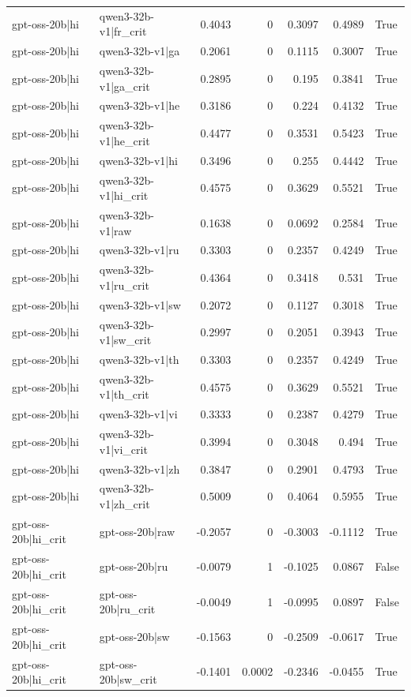 \begin{table}
\begin{tabular}{l l r r r r l}
gpt-oss-20b|hi & qwen3-32b-v1|fr_crit & 0.4043 & 0 & 0.3097 & 0.4989 & True \\
gpt-oss-20b|hi & qwen3-32b-v1|ga & 0.2061 & 0 & 0.1115 & 0.3007 & True \\
gpt-oss-20b|hi & qwen3-32b-v1|ga_crit & 0.2895 & 0 & 0.195 & 0.3841 & True \\
gpt-oss-20b|hi & qwen3-32b-v1|he & 0.3186 & 0 & 0.224 & 0.4132 & True \\
gpt-oss-20b|hi & qwen3-32b-v1|he_crit & 0.4477 & 0 & 0.3531 & 0.5423 & True \\
gpt-oss-20b|hi & qwen3-32b-v1|hi & 0.3496 & 0 & 0.255 & 0.4442 & True \\
gpt-oss-20b|hi & qwen3-32b-v1|hi_crit & 0.4575 & 0 & 0.3629 & 0.5521 & True \\
gpt-oss-20b|hi & qwen3-32b-v1|raw & 0.1638 & 0 & 0.0692 & 0.2584 & True \\
gpt-oss-20b|hi & qwen3-32b-v1|ru & 0.3303 & 0 & 0.2357 & 0.4249 & True \\
gpt-oss-20b|hi & qwen3-32b-v1|ru_crit & 0.4364 & 0 & 0.3418 & 0.531 & True \\
gpt-oss-20b|hi & qwen3-32b-v1|sw & 0.2072 & 0 & 0.1127 & 0.3018 & True \\
gpt-oss-20b|hi & qwen3-32b-v1|sw_crit & 0.2997 & 0 & 0.2051 & 0.3943 & True \\
gpt-oss-20b|hi & qwen3-32b-v1|th & 0.3303 & 0 & 0.2357 & 0.4249 & True \\
gpt-oss-20b|hi & qwen3-32b-v1|th_crit & 0.4575 & 0 & 0.3629 & 0.5521 & True \\
gpt-oss-20b|hi & qwen3-32b-v1|vi & 0.3333 & 0 & 0.2387 & 0.4279 & True \\
gpt-oss-20b|hi & qwen3-32b-v1|vi_crit & 0.3994 & 0 & 0.3048 & 0.494 & True \\
gpt-oss-20b|hi & qwen3-32b-v1|zh & 0.3847 & 0 & 0.2901 & 0.4793 & True \\
gpt-oss-20b|hi & qwen3-32b-v1|zh_crit & 0.5009 & 0 & 0.4064 & 0.5955 & True \\
gpt-oss-20b|hi_crit & gpt-oss-20b|raw & -0.2057 & 0 & -0.3003 & -0.1112 & True \\
gpt-oss-20b|hi_crit & gpt-oss-20b|ru & -0.0079 & 1 & -0.1025 & 0.0867 & False \\
gpt-oss-20b|hi_crit & gpt-oss-20b|ru_crit & -0.0049 & 1 & -0.0995 & 0.0897 & False \\
gpt-oss-20b|hi_crit & gpt-oss-20b|sw & -0.1563 & 0 & -0.2509 & -0.0617 & True \\
gpt-oss-20b|hi_crit & gpt-oss-20b|sw_crit & -0.1401 & 0.0002 & -0.2346 & -0.0455 & True \\

\end{tabular}
\end{table}
